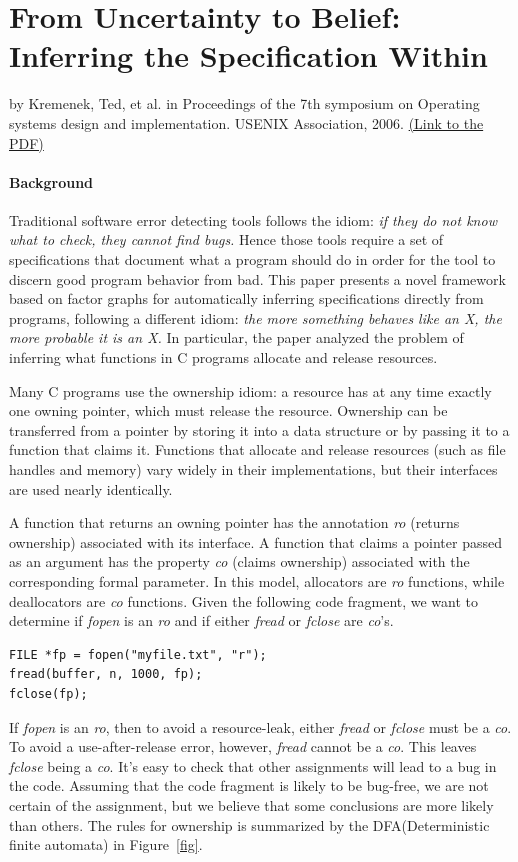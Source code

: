 \section{From Uncertainty to Belief: Inferring the Specification Within}
by Kremenek, Ted, et al. in Proceedings of the 7th symposium on Operating systems design and implementation. USENIX Association, 2006.
\href{http://www.usenix.org/events/osdi06/tech/full_papers/kremenek/kremenek.pdf}{(Link to the PDF)}

\paragraph{Background} 
Traditional software error detecting tools follows the idiom: {\it if they do not know what to check, they cannot find bugs.} Hence those tools require a set of specifications that document what a program should do in order for the tool to discern good program behavior from bad. This paper presents a novel framework based on factor graphs for automatically inferring specifications directly from programs, following a different idiom: {\it the more something behaves like an X, the more probable it is an X.} In particular, the paper analyzed the problem of inferring what functions in C programs allocate and release resources. 

Many C programs use the ownership idiom: a resource has at any time exactly one owning pointer, which must release the resource. Ownership can be transferred from a pointer by storing it into a data structure or by passing it to a function that claims it. Functions that allocate and release resources (such as file handles and memory) vary widely in their implementations, but their interfaces are used nearly identically. 


A function that returns an owning pointer has the annotation {\it ro} (returns ownership) associated with its interface. A function that claims a pointer passed as an argument has the property {\it co} (claims ownership) associated with the corresponding formal parameter. In this model, allocators are {\it ro} functions, while deallocators are {\it co} functions. Given the following code fragment, we want to determine if {\it fopen} is an {\it ro} and if either {\it fread} or {\it fclose} are {\it co}'s.

\begin{lstlisting}
FILE *fp = fopen("myfile.txt", "r");
fread(buffer, n, 1000, fp);
fclose(fp);
\end{lstlisting}
If {\it fopen} is an {\it ro}, then to avoid a resource-leak, either {\it fread} or {\it fclose} must be a {\it co}. To avoid a use-after-release error, however, {\it fread} cannot be a {\it co}. This leaves {\it fclose} being a {\it co}. It's easy to check that other assignments will lead to a bug in the code. Assuming that the code fragment is likely to be bug-free, we are not certain of the assignment, but we believe that some conclusions are more likely than others. The rules for ownership is summarized by the DFA(Deterministic finite automata) in Figure~\ref{fig}.

